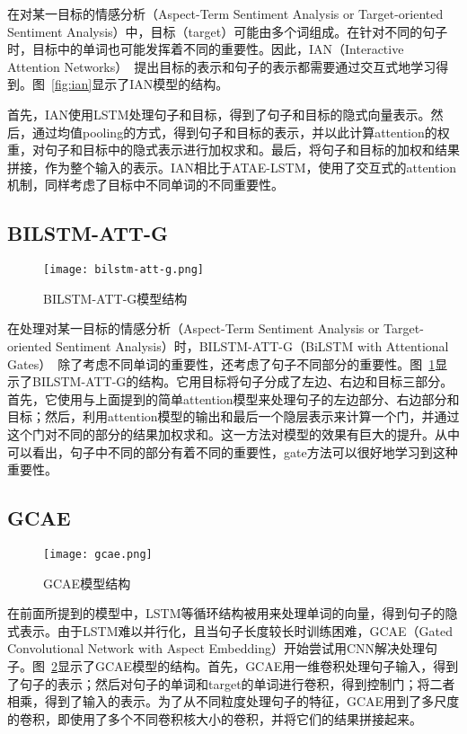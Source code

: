 在对某一目标的情感分析（Aspect-Term Sentiment Analysis or Target-oriented Sentiment Analysis）中，目标（target）可能由多个词组成。在针对不同的句子时，目标中的单词也可能发挥着不同的重要性。因此，IAN（Interactive Attention Networks）~\cite{ma2017interactive}提出目标的表示和句子的表示都需要通过交互式地学习得到。图~\ref{fig:ian}显示了IAN模型的结构。

首先，IAN使用LSTM处理句子和目标，得到了句子和目标的隐式向量表示。然后，通过均值pooling的方式，得到句子和目标的表示，并以此计算attention的权重，对句子和目标中的隐式表示进行加权求和。最后，将句子和目标的加权和结果拼接，作为整个输入的表示。IAN相比于ATAE-LSTM，使用了交互式的attention机制，同样考虑了目标中不同单词的不同重要性。

\subsection{BILSTM-ATT-G}

\begin{figure}[ht]
    \centering 
    \texttt{[image: bilstm-att-g.png]}
    \caption{BILSTM-ATT-G模型结构}
    \label{fig:bilstm-att-g}
\end{figure}

在处理对某一目标的情感分析（Aspect-Term Sentiment Analysis or Target-oriented Sentiment Analysis）时，BILSTM-ATT-G（BiLSTM with Attentional Gates）~\cite{liu2017attention}除了考虑不同单词的重要性，还考虑了句子不同部分的重要性。图~\ref{fig:bilstm-att-g}显示了BILSTM-ATT-G的结构。它用目标将句子分成了左边、右边和目标三部分。首先，它使用与上面提到的简单attention模型来处理句子的左边部分、右边部分和目标；然后，利用attention模型的输出和最后一个隐层表示来计算一个门，并通过这个门对不同的部分的结果加权求和。这一方法对模型的效果有巨大的提升。从中可以看出，句子中不同的部分有着不同的重要性，gate方法可以很好地学习到这种重要性。

\subsection{GCAE}

\begin{figure}[ht]
    \centering 
    \texttt{[image: gcae.png]}
    \caption{GCAE模型结构}
    \label{fig:gcae}
\end{figure}

在前面所提到的模型中，LSTM等循环结构被用来处理单词的向量，得到句子的隐式表示。由于LSTM难以并行化，且当句子长度较长时训练困难，GCAE（Gated Convolutional Network with Aspect Embedding）开始尝试用CNN\cite{krizhevsky2012imagenet,grefenstette2014convolutional}解决处理句子。图~\ref{fig:gcae}显示了GCAE模型的结构。首先，GCAE用一维卷积处理句子输入，得到了句子的表示；然后对句子的单词和target的单词进行卷积，得到控制门；将二者相乘，得到了输入的表示。为了从不同粒度处理句子的特征，GCAE用到了多尺度的卷积，即使用了多个不同卷积核大小的卷积，并将它们的结果拼接起来。


